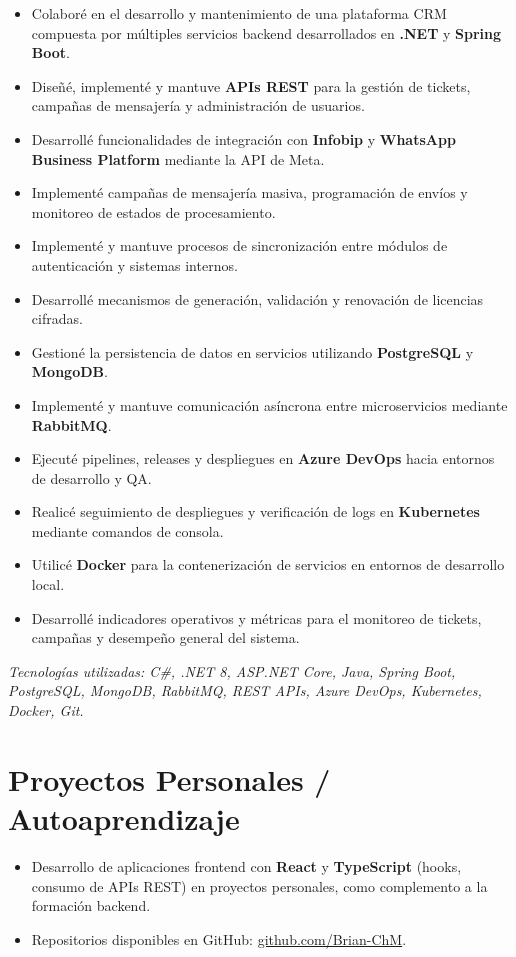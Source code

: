 \documentclass[10.5pt,a4paper]{article}
\begin{document}
\begin{itemize}
  \item Colaboré en el desarrollo y mantenimiento de una plataforma CRM compuesta por múltiples servicios backend desarrollados en \textbf{.NET} y \textbf{Spring Boot}.
  \item Diseñé, implementé y mantuve \textbf{APIs REST} para la gestión de tickets, campañas de mensajería y administración de usuarios.
  \item Desarrollé funcionalidades de integración con \textbf{Infobip} y \textbf{WhatsApp Business Platform} mediante la API de Meta.
  \item Implementé campañas de mensajería masiva, programación de envíos y monitoreo de estados de procesamiento.
  \item Implementé y mantuve procesos de sincronización entre módulos de autenticación y sistemas internos.
  \item Desarrollé mecanismos de generación, validación y renovación de licencias cifradas.
  \item Gestioné la persistencia de datos en servicios utilizando \textbf{PostgreSQL} y \textbf{MongoDB}.
  \item Implementé y mantuve comunicación asíncrona entre microservicios mediante \textbf{RabbitMQ}.
  \item Ejecuté pipelines, releases y despliegues en \textbf{Azure DevOps} hacia entornos de desarrollo y QA.
  \item Realicé seguimiento de despliegues y verificación de logs en \textbf{Kubernetes} mediante comandos de consola.
  \item Utilicé \textbf{Docker} para la contenerización de servicios en entornos de desarrollo local.
  \item Desarrollé indicadores operativos y métricas para el monitoreo de tickets, campañas y desempeño general del sistema.
\end{itemize}

\vspace{2pt}
{\small\textit{Tecnologías utilizadas: C\#, .NET 8, ASP.NET Core, Java, Spring Boot, PostgreSQL, MongoDB, RabbitMQ, REST APIs, Azure DevOps, Kubernetes, Docker, Git.}}

\section*{Proyectos Personales / Autoaprendizaje}
\begin{itemize}
  \item Desarrollo de aplicaciones frontend con \textbf{React} y \textbf{TypeScript} (hooks, consumo de APIs REST) en proyectos personales, como complemento a la formación backend.
  \item Repositorios disponibles en GitHub: \href{https://github.com/Brian-ChM}{github.com/Brian-ChM}.
\end{itemize}
\end{document}
